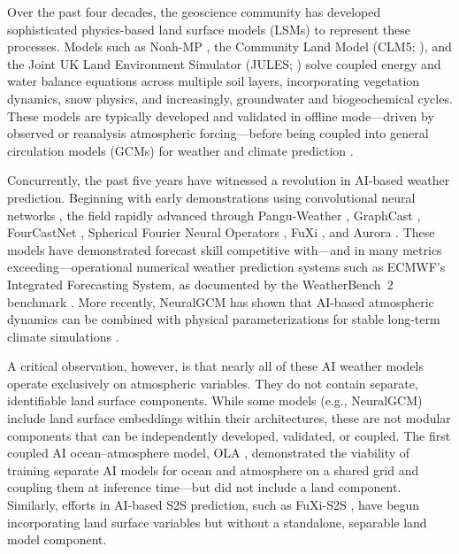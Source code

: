 \documentclass[11pt]{article}
\begin{document}
Over the past four decades, the geoscience community has developed sophisticated physics-based land surface models (LSMs) to represent these processes. Models such as Noah-MP \citep{niu2011noahmp, ek2003noah}, the Community Land Model (CLM5; \citealt{lawrence2019clm5}), and the Joint UK Land Environment Simulator (JULES; \citealt{best2011jules}) solve coupled energy and water balance equations across multiple soil layers, incorporating vegetation dynamics, snow physics, and increasingly, groundwater and biogeochemical cycles. These models are typically developed and validated in offline mode---driven by observed or reanalysis atmospheric forcing---before being coupled into general circulation models (GCMs) for weather and climate prediction \citep{bauer2015quietrev}.

Concurrently, the past five years have witnessed a revolution in AI-based weather prediction. Beginning with early demonstrations using convolutional neural networks \citep{weyn2019dlwp, weyn2020dlwpcs}, the field rapidly advanced through Pangu-Weather \citep{bi2023pangu}, GraphCast \citep{lam2023graphcast}, FourCastNet \citep{pathak2022fourcastnet}, Spherical Fourier Neural Operators \citep{bonev2023sfno}, FuXi \citep{chen2023fuxi}, and Aurora \citep{bodnar2024aurora}. These models have demonstrated forecast skill competitive with---and in many metrics exceeding---operational numerical weather prediction systems such as ECMWF's Integrated Forecasting System, as documented by the WeatherBench~2 benchmark \citep{rasp2024weatherbench2}. More recently, NeuralGCM has shown that AI-based atmospheric dynamics can be combined with physical parameterizations for stable long-term climate simulations \citep{kochkov2024neuralGCM}.

A critical observation, however, is that nearly all of these AI weather models operate exclusively on atmospheric variables. They do not contain separate, identifiable land surface components. While some models (e.g., NeuralGCM) include land surface embeddings within their architectures, these are not modular components that can be independently developed, validated, or coupled. The first coupled AI ocean--atmosphere model, OLA \citep{caillon2024ola}, demonstrated the viability of training separate AI models for ocean and atmosphere on a shared grid and coupling them at inference time---but did not include a land component. Similarly, efforts in AI-based S2S prediction, such as FuXi-S2S \citep{chen2024fuxis2s}, have begun incorporating land surface variables but without a standalone, separable land model component.
\end{document}
